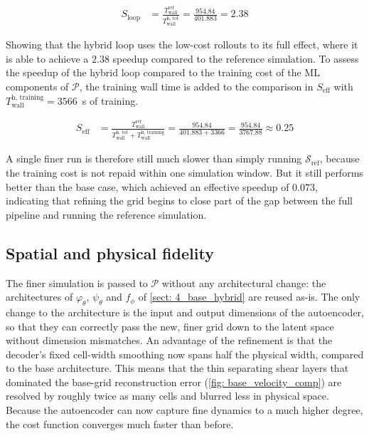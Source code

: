 \begin{align}
    S_\text{loop}
    &= \frac{T_\text{wall}^\text{ref}}{T_\text{wall}^\text{h, tot}}
    = \frac{954.84}{401.883} = 2.38
\end{align}

Showing that the hybrid loop uses the low-cost rollouts to its full effect, where it is able to achieve a $2.38$ speedup compared to the reference simulation. To assess the speedup of the hybrid loop compared to the training cost of the ML components of $\mathcal{P}$, the training wall time is added to the comparison in $S_\text{eff}$ with $T_\text{wall}^\text{h, training} = 3566$~s of training.

\begin{align}
    S_\text{eff}
    &= \frac{T_\text{wall}^\text{ref}}{T_\text{wall}^\text{h, tot} + T_\text{wall}^\text{h, training}}
    = \frac{954.84}{401.883 + 3366}
    = \frac{954.84}{3767.88} \approx 0.25
\end{align}

A single finer run is therefore still much slower than simply running $\mathcal{S}_\text{ref}$, because the training cost is not repaid within one simulation window. But it still performs better than the base case, which achieved an effective speedup of $0.073$, indicating that refining the grid begins to close part of the gap between the full pipeline and running the reference simulation. 

\subsection{Spatial and physical fidelity}
The finer simulation is passed to $\mathcal{P}$ without any architectural change: the architectures of $\varphi_\theta$, $\psi_\theta$ and $f_\phi$ of \autoref{sect: 4_base_hybrid} are reused as-is. The only change to the architecture is the input and output dimensions of the autoencoder, so that they can correctly pass the new, finer grid down to the latent space without dimension mismatches. An advantage of the refinement is that the decoder's
fixed cell-width smoothing now spans half the physical width, compared to the base architecture. This means that the thin separating shear layers that dominated the base-grid reconstruction error (\autoref{fig: base_velocity_comp}) are resolved by roughly twice as many cells and blurred less in physical space. Because the autoencoder can now capture fine dynamics to a much higher degree, the cost function converges much faster than before. 


